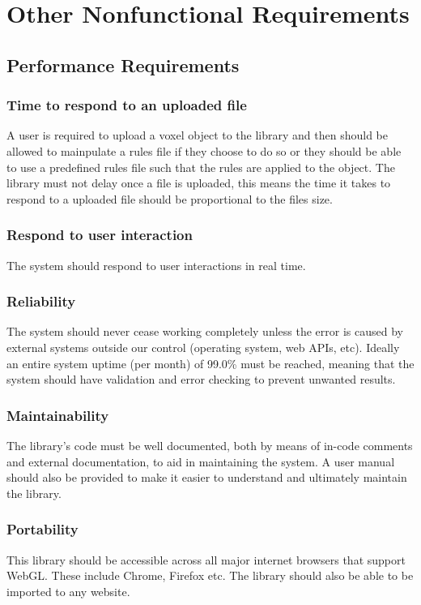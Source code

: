 \documentclass[english]{article}
\begin{document}
	\section{Other Nonfunctional Requirements}
	
		\subsection{Performance Requirements}
		\subsubsection {Time to respond to an uploaded file}
		A user is required to upload a voxel object to the library and then should be allowed to mainpulate a rules file if they choose to do so or they should be able to use a predefined rules file such that the rules are applied to the object. The library must not delay once a file is uploaded, this means the time it takes to respond to a uploaded file should be proportional to the files size.
		
		\subsubsection{Respond to user interaction}
		The system should respond to user interactions in real time.
		
		\subsubsection{Reliability}
		The system should never cease working completely unless the error is caused by external systems outside our control (operating system, web APIs, etc). Ideally an entire system uptime (per month) of 99.0\% must be reached, meaning that the system should have validation and error checking to prevent unwanted results.
		
		\subsubsection{Maintainability}
		The library's code must be well documented, both by means of in-code comments and external documentation, to aid in 
		maintaining the system. A user manual should also be provided to make it easier to understand and ultimately maintain the library.
		
		\subsubsection{Portability}
		This library should be accessible across all major internet browsers that support WebGL. These include Chrome, Firefox etc.
		The library should also be able to be imported to any website.
		
\end{document}
